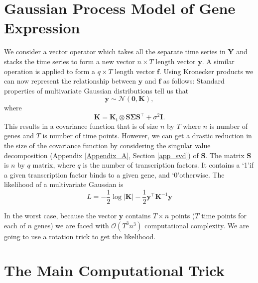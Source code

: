 \section{Gaussian Process Model of Gene Expression}
We consider a vector operator which takes all the separate time series in $\mathbf{Y}$ and stacks the time series to form a new vector $n\times T$ length vector $\mathbf{y}$. A similar operation is applied to form a $q \times T$ length vector $\mathbf{f}$. Using Kronecker products we can now represent the relationship between $\mathbf{y}$ and $\mathbf{f}$ as follows: Standard properties of multivariate Gaussian distributions tell us that
\begin{equation} \label{eq:mGPd}
\mathbf{y} \sim \mathcal{N}(\mathbf{0}, \mathbf{K}),
\end{equation}
where
\begin{equation} \label{eq:K}
\mathbf{K} = \mathbf{K}_t \otimes \mathbf{S} \boldsymbol{\Sigma} \mathbf{S}^\top + \sigma^2 \mathbf{I}.
\end{equation}
This results in a covariance function that is of size $n$ by $T$ where $n$ is number of genes and $T$ is number of time points. However, we can get a drastic reduction in the size of the covariance function by considering the singular value decomposition (Appendix \ref{Appendix_A}, Section \ref{app_svd}) of $\mathbf{S}$. The matrix $\mathbf{S}$ is $n$ by $q$ matrix, where $q$ is the number of transcription factors. It contains a \lq 1\rq if a given transcription factor binds to a given gene, and \lq 0\rq otherwise. The likelihood of a multivariate Gaussian is
\begin{equation} \label{eq:Likelihood}
L = -\frac{1}{2} \log |\mathbf{K}| - \frac{1}{2} \mathbf{y}^\top \mathbf{K}^{-1} \mathbf{y}
\end{equation}

In the worst case, because the vector $\mathbf{y}$ contains $T\times n$ points ($T$ time points for each of $n$ genes) we are faced with $\mathcal{O}(T^3n^3)$ computational complexity. We are going to use a rotation trick to get the likelihood. 

\section{The Main Computational Trick}

